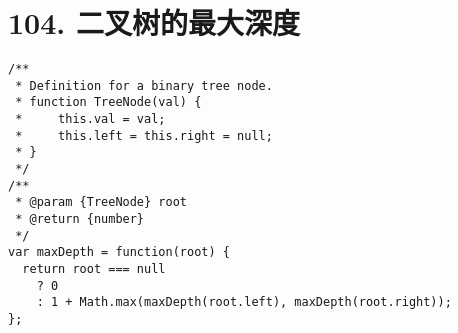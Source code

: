 \newpage
\section{104. 二叉树的最大深度}
\label{leetcode:104}

\begin{verbatim}
/**
 * Definition for a binary tree node.
 * function TreeNode(val) {
 *     this.val = val;
 *     this.left = this.right = null;
 * }
 */
/**
 * @param {TreeNode} root
 * @return {number}
 */
var maxDepth = function(root) {
  return root === null
    ? 0
    : 1 + Math.max(maxDepth(root.left), maxDepth(root.right));
};
\end{verbatim}